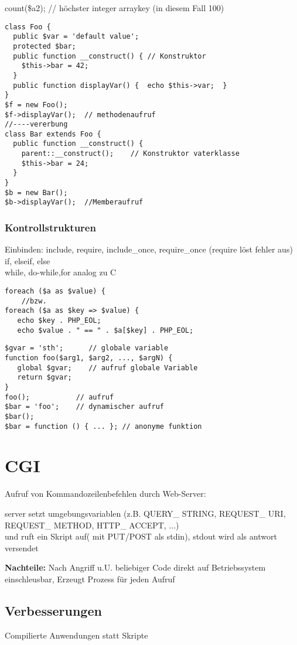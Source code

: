 count(\$a2); // höchster integer arraykey (in diesem Fall 100)
\begin{verbatim}
class Foo {
  public $var = 'default value';
  protected $bar;
  public function __construct() { // Konstruktor
    $this->bar = 42;
  }
  public function displayVar() {  echo $this->var;  }
}
$f = new Foo();
$f->displayVar();  // methodenaufruf
//----vererbung
class Bar extends Foo {
  public function __construct() {
    parent::__construct();    // Konstruktor vaterklasse
    $this->bar = 24;
  }
}
$b = new Bar();
$b->displayVar();  //Memberaufruf
\end{verbatim}
\newpage
\subsubsection{Kontrollstrukturen}
Einbinden: include, require, include\_once, require\_once (require löst fehler aus)\\
if, elseif, else\\
while, do-while,for analog zu C
\begin{verbatim}
foreach ($a as $value) {
	//bzw.
foreach ($a as $key => $value) {
   echo $key . PHP_EOL;   
   echo $value . " == " . $a[$key] . PHP_EOL;
\end{verbatim}
\begin{verbatim}
$gvar = 'sth';      // globale variable
function foo($arg1, $arg2, ..., $argN) {
   global $gvar;    // aufruf globale Variable
   return $gvar;
}
foo();           // aufruf
$bar = 'foo';    // dynamischer aufruf
$bar();
$bar = function () { ... }; // anonyme funktion
\end{verbatim}
\section{CGI}
Aufruf von Kommandozeilenbefehlen durch Web-Server: 

server setzt umgebungsvariablen (z.B. QUERY\_ STRING, REQUEST\_ URI, REQUEST\_ METHOD, HTTP\_ ACCEPT, ...) \\ und ruft ein Skript auf( mit PUT/POST als stdin), stdout wird als antwort versendet

\textbf{Nachteile: }Nach Angriff u.U. beliebiger Code direkt auf Betriebssystem einschleusbar, Erzeugt Prozess für jeden Aufruf
\subsection{Verbesserungen}
Compilierte Anwendungen statt Skripte

